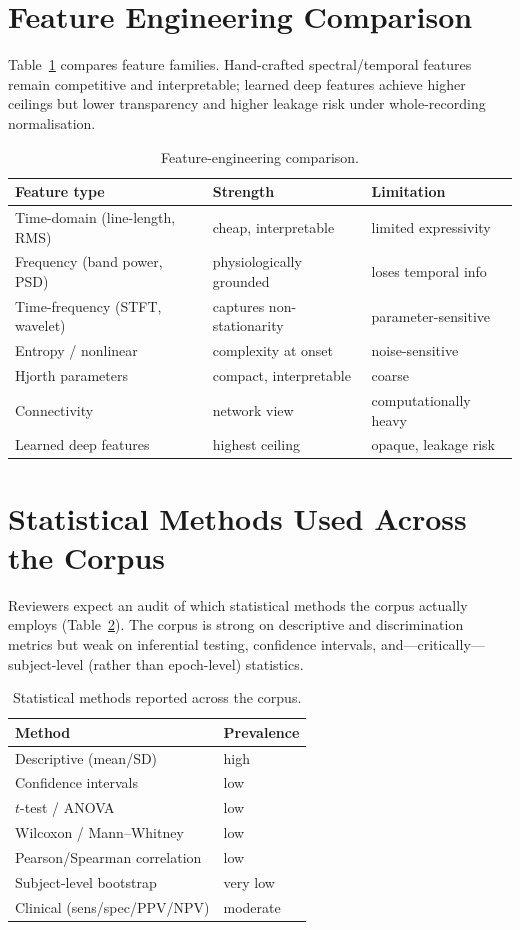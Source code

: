 \section{Feature Engineering Comparison}
Table~\ref{tab:featcmp} compares feature families. Hand-crafted spectral/temporal features remain competitive and interpretable; learned deep features achieve higher ceilings but lower transparency and higher leakage risk under whole-recording normalisation.
\begin{table}[t]\centering\caption{Feature-engineering comparison.}\label{tab:featcmp}
\footnotesize\begin{tabular}{lll}\toprule
Feature type & Strength & Limitation\\\midrule
Time-domain (line-length, RMS) & cheap, interpretable & limited expressivity\\
Frequency (band power, PSD) & physiologically grounded & loses temporal info\\
Time-frequency (STFT, wavelet) & captures non-stationarity & parameter-sensitive\\
Entropy / nonlinear & complexity at onset & noise-sensitive\\
Hjorth parameters & compact, interpretable & coarse\\
Connectivity & network view & computationally heavy\\
Learned deep features & highest ceiling & opaque, leakage risk\\\bottomrule
\end{tabular}\end{table}

\section{Statistical Methods Used Across the Corpus}
Reviewers expect an audit of which statistical methods the corpus actually employs (Table~\ref{tab:statcmp}). The corpus is strong on descriptive and discrimination metrics but weak on inferential testing, confidence intervals, and---critically---subject-level (rather than epoch-level) statistics.
\begin{table}[t]\centering\caption{Statistical methods reported across the corpus.}\label{tab:statcmp}
\footnotesize\begin{tabular}{ll}\toprule
Method & Prevalence\\\midrule
Descriptive (mean/SD) & high\\
Confidence intervals & low\\
$t$-test / ANOVA & low\\
Wilcoxon / Mann--Whitney & low\\
Pearson/Spearman correlation & low\\
Subject-level bootstrap & very low\\
Clinical (sens/spec/PPV/NPV) & moderate\\\bottomrule
\end{tabular}\end{table}

